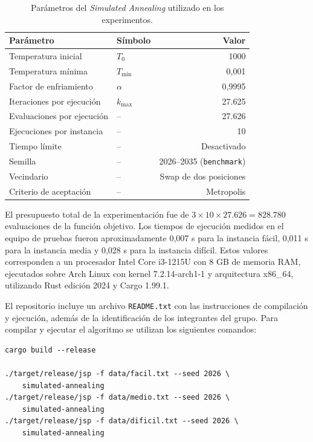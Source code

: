 \begin{table}[htbp]
\centering
\begin{tabular}{llr}
\toprule
Parámetro & Símbolo & Valor \\
\midrule
Temperatura inicial & \(T_0\) & 1000 \\
Temperatura mínima & \(T_{\min}\) & 0,001 \\
Factor de enfriamiento & \(\alpha\) & 0,9995 \\
Iteraciones por ejecución & \(k_{\max}\) & 27.625 \\
Evaluaciones por ejecución & -- & 27.626 \\
Ejecuciones por instancia & -- & 10 \\
Tiempo límite & -- & Desactivado \\
Semilla & -- & 2026--2035 (\texttt{benchmark}) \\
Vecindario & -- & Swap de dos posiciones \\
Criterio de aceptación & -- & Metropolis \\
\bottomrule
\end{tabular}
\caption{Parámetros del \emph{Simulated Annealing} utilizado en los experimentos.}
\label{tab:parametros}
\end{table}

El presupuesto total de la experimentación fue de \(3 \times 10 \times 27.626 = 828.780\)
evaluaciones de la función objetivo.
Los tiempos de ejecución medidos en el equipo de pruebas fueron aproximadamente 0,007 s para la instancia fácil,
0,011 s para la instancia media y 0,028 s para la instancia difícil.
Estos valores corresponden a un procesador Intel Core i3-1215U con 8 GB de memoria RAM,
ejecutados sobre Arch Linux con kernel 7.2.14-arch1-1 y arquitectura x86\_64,
utilizando Rust edición 2024 y Cargo 1.99.1.

%
El repositorio incluye un archivo \texttt{README.txt} con las instrucciones de compilación y ejecución,
además de la identificación de los integrantes del grupo.
Para compilar y ejecutar el algoritmo se utilizan los siguientes comandos:

\begin{verbatim}
cargo build --release

./target/release/jsp -f data/facil.txt --seed 2026 \
    simulated-annealing
./target/release/jsp -f data/medio.txt --seed 2026 \
    simulated-annealing
./target/release/jsp -f data/dificil.txt --seed 2026 \
    simulated-annealing
\end{verbatim}

